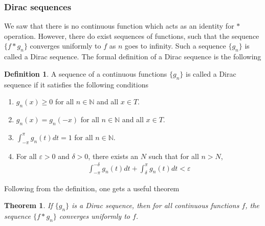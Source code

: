 \documentclass[12pt, titlepage]{article}
\newtheorem{thm}{Theorem}[section]
\theoremstyle{definition}
\newtheorem{defn}{Definition}[section]
\newcommand{\vep}{\varepsilon}
\begin{document}

\subsubsection{Dirac sequences}
We saw that there is no continuous function which acts as an identity for $\ast$ operation. However, there do exist sequences of functions, such that the sequence $\{f \ast g_n\}$ converges uniformly to $f$ as $n$ goes to infinity. Such a sequence $\{g_n\}$ is called a Dirac sequence. The formal definition of a Dirac sequence is the following
\begin{defn}
    A sequence of a continuous functions $\{g_n\}$ is called a Dirac sequence if it satisfies the following conditions
    \begin{enumerate}
        \item $g_n(x) \geq 0$ for all $n \in \mathbb{N}$ and all $x \in T$.
        \item $g_n(x) = g_n(-x)$ for all $n \in \mathbb{N}$ and all $x \in T$.
        \item $\displaystyle \int_{-\pi}^{\pi} g_n(t) dt = 1$ for all $n \in \mathbb{N}$.
        \item For all $\vep >0$ and $\delta > 0$, there exists an $N$ such that for all $n > N$,
        \begin{align*}
            \int_{-\pi}^{-\delta} g_n(t) dt + \int_{\delta}^{\pi} g_n(t) dt < \vep
        \end{align*}
    \end{enumerate}
\end{defn}
Following from the definition, one gets a useful theorem
\begin{thm}\label{th:1}
    If $\{g_n\}$ is a Dirac sequence, then for all continuous functions $f$, the sequence $\{f \ast g_n\}$ converges uniformly to $f$.
\end{thm}
\end{document}
